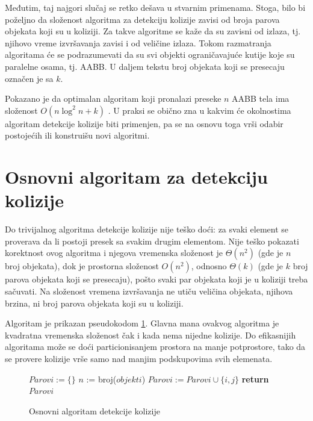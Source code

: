 \documentclass[12pt,oneside]{memoir}
\begin{document}
Međutim, taj najgori slučaj se retko dešava u stvarnim primenama. 
Stoga, bilo bi poželjno da složenost algoritma za detekciju kolizije zavisi od broja parova objekata koji su u koliziji.
Za takve algoritme se kaže da su zavisni od izlaza, tj. njihovo vreme izvršavanja zavisi i od veličine izlaza. 
Tokom razmatranja algoritama će se podrazumevati da su svi objekti ograničavajuće kutije koje su paralelne osama,
tj. AABB. U daljem tekstu broj objekata koji se presecaju označen je sa $k$.

Pokazano je da optimalan algoritam koji pronalazi preseke $n$ AABB tela ima složenost 
$O(n \log^2 n + k)$ \cite{glavna1}. 
U praksi se obično zna u kakvim će okolnostima algoritam detekcije kolizije biti primenjen, pa 
se na osnovu toga vrši odabir postojećih ili konstruišu novi algoritmi.

\section{Osnovni algoritam za detekciju kolizije}
\label{subsec:triv}

Do trivijalnog algoritma detekcije kolizije nije teško doći: za svaki element se proverava da li postoji presek sa svakim drugim elementom.
Nije teško pokazati korektnost ovog algoritma i njegova vremenska složenost je $\Theta (n^2) $ (gde je $n$ broj objekata), dok je prostorna složenost
$O(n^2)$, odnosno $\Theta(k)$ (gde je $k$ broj parova objekata koji se presecaju), pošto svaki par objekata koji je u koliziji treba sačuvati.
Na složenost vremena izvršavanja ne utiču veličina objekata, njihova brzina, ni broj parova objekata koji su u koliziji.

Algoritam je prikazan pseudokodom \ref{alg:triv}.
Glavna mana ovakvog algoritma je kvadratna vremenska složenost čak i kada nema nijedne kolizije.
Do efikasnijih algoritama može se doći particionisanjem prostora na manje potprostore, tako da
se provere kolizije vrše samo nad manjim podskupovima svih elemenata.

\begin{figure}[!h]
    \label{alg:triv}
	\begin{algorithmic}[1]
		\State $Parovi := \{ \}$
		\State $n$ := broj($objekti$)
				\State $Parovi:=Parovi \cup \{i, j\}$
			\EndIf		
		\EndFor
		\EndFor
		\State \textbf{return} $Parovi$
		\EndProcedure
    \end{algorithmic}
\caption{Osnovni algoritam detekcije kolizije}
\end{figure}
\end{document}
